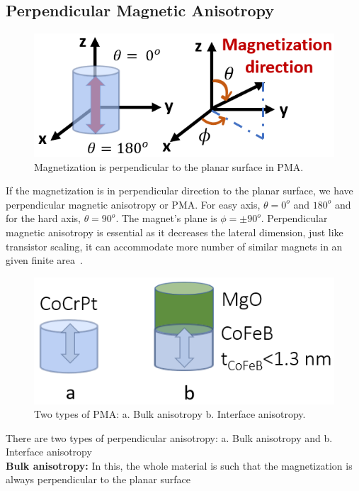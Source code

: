 \documentclass[12pt,a4paper,bold]{thesis}
\theoremstyle{thm}
\theoremstyle{definition}
\begin{document}
\subsection{Perpendicular Magnetic Anisotropy}
\begin{figure}[H]
	\centering
  \includegraphics[scale=0.56]{Images/22.png}
  \caption{Magnetization is perpendicular to the planar surface in PMA.}
\end{figure}
\indent \indent \indent If the magnetization is in perpendicular direction to the planar surface, we have perpendicular magnetic anisotropy or PMA. For easy axis, $\theta = 0^o$ and $180^o$ and for the hard axis, $\theta = 90^o$.  The magnet's plane is $\phi=\pm 90^o$. Perpendicular magnetic anisotropy is essential as it decreases the lateral dimension, just like transistor scaling, it can accommodate more number of similar magnets in an given finite area~\cite{ikeda2010perpendicular,roy15_3}.
\begin{figure}[H]
	\centering
  \includegraphics[scale=0.56]{Images/23.png}
  \caption{Two types of PMA: a. Bulk anisotropy b. Interface anisotropy.}
\end{figure}
There are two types of perpendicular anisotropy: a. Bulk anisotropy and b. Interface anisotropy\\
\textbf{Bulk anisotropy:} In this, the whole material is such that the magnetization is always perpendicular to the planar surface\\
\end{document}
